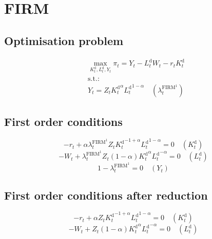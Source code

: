 \section{FIRM}

\subsection{Optimisation problem}

\begin{align}
&\max_{K^{\mathrm{d}}_{t}, L^{\mathrm{d}}_{t}, Y_{t}
} \pi_{t} = Y_{t} - {L^{\mathrm{d}}_{t}} {W_{t}} - {r_{t}} {K^{\mathrm{d}}_{t}}\\
&\mathrm{s.t.:}\nonumber\\
& Y_{t} = {Z_{t}} {{K^{\mathrm{d}}_{t}}^{\alpha}} {{L^{\mathrm{d}}_{t}}^{1 - \alpha}} \quad \left(\lambda^{\mathrm{FIRM}^{\mathrm{1}}}_{t}\right)
\end{align}


\subsection{First order conditions}

\begin{equation}
-r_{t} + {\alpha} {\lambda^{\mathrm{FIRM}^{\mathrm{1}}}_{t}} {Z_{t}} {{K^{\mathrm{d}}_{t}}^{-1 + \alpha}} {{L^{\mathrm{d}}_{t}}^{1 - \alpha}} = 0
 \quad \left(K^{\mathrm{d}}_{t}\right)
\end{equation}
\begin{equation}
-W_{t} + {\lambda^{\mathrm{FIRM}^{\mathrm{1}}}_{t}} {Z_{t}} \left(1 - \alpha\right) {{K^{\mathrm{d}}_{t}}^{\alpha}} {{L^{\mathrm{d}}_{t}}^{-\alpha}} = 0
 \quad \left(L^{\mathrm{d}}_{t}\right)
\end{equation}
\begin{equation}
1 - \lambda^{\mathrm{FIRM}^{\mathrm{1}}}_{t} = 0
 \quad \left(Y_{t}\right)
\end{equation}


\subsection{First order conditions after reduction}

\begin{equation}
-r_{t} + {\alpha} {Z_{t}} {{K^{\mathrm{d}}_{t}}^{-1 + \alpha}} {{L^{\mathrm{d}}_{t}}^{1 - \alpha}} = 0
 \quad \left(K^{\mathrm{d}}_{t}\right)
\end{equation}
\begin{equation}
-W_{t} + {Z_{t}} \left(1 - \alpha\right) {{K^{\mathrm{d}}_{t}}^{\alpha}} {{L^{\mathrm{d}}_{t}}^{-\alpha}} = 0
 \quad \left(L^{\mathrm{d}}_{t}\right)
\end{equation}




